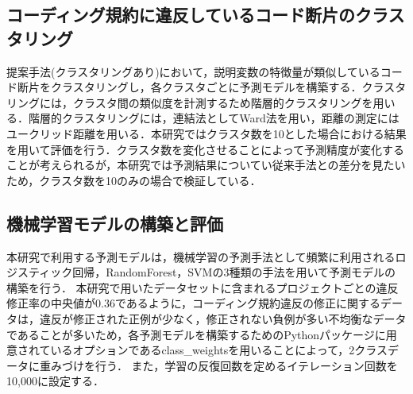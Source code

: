 \documentclass[submit,noauthor,dvipdfmx]{ipsj}
\begin{document}
\begin{table}[t]
    \centering
    \caption{正例と負例の分類}
    \label{tab:pos_neg}
\end{table}

\subsection{コーディング規約に違反しているコード断片のクラスタリング}


提案手法(クラスタリングあり)において，説明変数の特徴量が類似しているコード断片をクラスタリングし，各クラスタごとに予測モデルを構築する．クラスタリングには，クラスタ間の類似度を計測するため階層的クラスタリングを用いる．階層的クラスタリングには，連結法としてWard法を用い，距離の測定にはユークリッド距離を用いる\cite{ward}．本研究ではクラスタ数を10とした場合における結果を用いて評価を行う．クラスタ数を変化させることによって予測精度が変化することが考えられるが，本研究では予測結果についてい従来手法との差分を見たいため，クラスタ数を10のみの場合で検証している．


\subsection{機械学習モデルの構築と評価}

本研究で利用する予測モデルは，機械学習の予測手法として頻繁に利用されるロジスティック回帰，RandomForest，SVMの3種類の手法を用いて予測モデルの構築を行う．
本研究で用いたデータセットに含まれるプロジェクトごとの違反修正率の中央値が0.36であるように，コーディング規約違反の修正に関するデータは，違反が修正された正例が少なく，修正されない負例が多い不均衡なデータであることが多いため，各予測モデルを構築するためのPythonパッケージに用意されているオプションであるclass\_weightsを用いることによって，2クラスデータに重みづけを行う．
また，学習の反復回数を定めるイテレーション回数を10,000に設定する．
\end{document}
